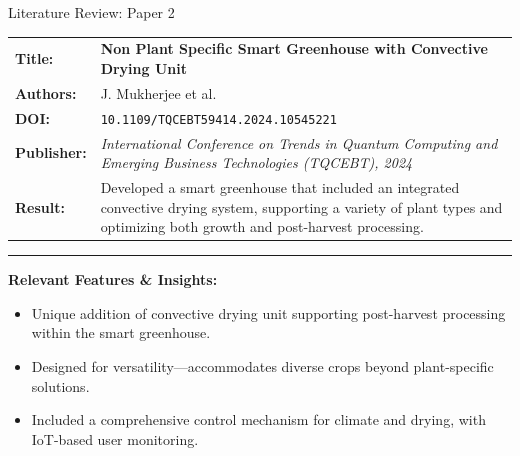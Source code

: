 \documentclass{beamer}
\begin{document}
\begin{frame} {Literature Review: Paper 2}

    \begin{tabularx} {\textwidth} {
            >{\bfseries}m{2.0cm}X
        }

        Title: & \textbf{Non Plant Specific Smart Greenhouse with Convective Drying Unit}
        \\

        Authors: & J. Mukherjee et al.
        \\

        DOI: & \texttt{10.1109/TQCEBT59414.2024.10545221}

        \\

        Publisher: & \textit{International Conference on Trends in Quantum Computing and Emerging Business Technologies (TQCEBT), 2024} \vfill
        \\

        Result: &
        Developed a smart greenhouse that included an integrated convective drying system, supporting a variety
        of plant types and optimizing both growth and post-harvest processing.

        \\

    \end{tabularx}

    {\color{leafColorSecondary} \rule{\textwidth}{0.75pt}}

    \textbf{Relevant Features \& Insights:}

    \begin{itemize}

        \item Unique addition of convective drying unit supporting post-harvest processing within the smart greenhouse.

        \item Designed for versatility—accommodates diverse crops beyond plant-specific solutions.

        \item Included a comprehensive control mechanism for climate and drying, with IoT-based user monitoring.

    \end{itemize}

\end{frame}
\end{document}
